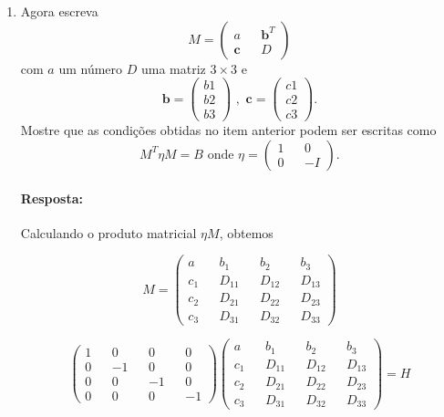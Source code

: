 \documentclass[10pt,a4paper]{article}
\begin{document}
\begin{enumerate}
	\item Agora escreva
	\begin{equation}\nonumber
		M =\left(\begin{matrix}
			a && \mathbf{b}^{T} \\
			\mathbf{c} && D
		\end{matrix}\right)
	\end{equation}
com $ a $ um número $ D $ uma matriz $ 3 \times 3 $ e
\begin{equation}\nonumber
	\mathbf{b} = \left(\begin{matrix}
		b1 \\
		b2 \\
		b3
	\end{matrix}\right) \,\, , \,\, 	\mathbf{c} = \left(\begin{matrix}
	c1 \\
	c2 \\
	c3
\end{matrix}\right).
\end{equation}
Mostre que as condições obtidas no item anterior podem ser escritas como
\begin{equation}\nonumber
	M^T\eta M = B \text{   onde } \eta = \left( \begin{matrix}
		1 && 0 \\
		0 && -I
	\end{matrix}\right).
\end{equation}
\paragraph{Resposta:}
Calculando o produto matricial $ \eta M $, obtemos

\begin{equation}\nonumber
	M = \left(\begin{matrix}
		a && b_1 && b_2 && b_3 \\
		c_1 && D_{11} && D_{12} && D_{13} \\
		c_2 && D_{21} && D_{22} && D_{23}\\
		c_3 && D_{31} && D_{32} && D_{33}
	\end{matrix}\right) 
\end{equation}

\begin{equation}\nonumber
	\left(\begin{matrix}
		1 && 0 && 0 && 0 \\
		0 && -1 && 0 && 0 \\
		0 && 0 && -1 && 0 \\
		0 && 0 && 0 && -1
	\end{matrix}\right)
	\left(\begin{matrix}
		a && b_1 && b_2 && b_3 \\
		c_1 && D_{11} && D_{12} && D_{13} \\
		c_2 && D_{21} && D_{22} && D_{23}\\
		c_3 && D_{31} && D_{32} && D_{33}
	\end{matrix}\right) = H
\end{equation}


\end{enumerate}
\end{document}
